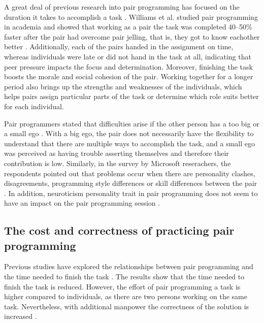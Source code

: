 \documentclass[conference]{IEEEtran}
\begin{document}
A great deal of previous research into pair programming has focused on the duration it takes to accomplish a task \cite{10.1145/2652524.2652529, Williams2000Strengthening, Hannay2009effectiveness}. Williams et al. studied pair programming in academia and showed that working as a pair the task was completed 40--50\% faster after the pair had overcome pair jelling, that is, they got to know eachother better \cite{Williams2000Strengthening}. Additionally, each of the pairs handed in the assignment on time, whereas individuals were late or did not hand in the task at all, indicating that peer pressure impacts the focus and determination. Moreover, finishing the task boosts the morale and social cohesion of the pair. Working together for a longer period also brings up the strengths and weaknesses of the individuals, which helps pairs assign particular parts of the task or determine which role suits better for each individual.

Pair programmers stated that difficulties arise if the other person has a too big or a small ego \cite{Williams2000Strengthening}. With a big ego, the pair does not necessarily have the flexibility to understand that there are multiple ways to accomplish the task, and a small ego was perceived as having trouble asserting themselves and therefore their contribution is low. Similarly, in the survey by Microsoft reserachers, the respondents pointed out that problems occur when there are personality clashes, disagreements, programming style differences or skill differences between the pair \cite{10.1145/1414004.1414026}. In addition, neuroticism personality trait in pair programming does not seem to have an impact on the pair programming session \cite{10.1145/1852786.1852816}. 



\subsection{The cost and correctness of practicing pair programming}

Previous studies have explored the relationships between pair programming and the time needed to finish the task \cite{10.1145/1414004.1414026, 10.5555/377517.377531, Arisholm2007Evaluating}. The results show that the time needed to finish the task is reduced. However, the effort of pair programming a task is higher compared to individuals, as there are two persons working on the same task. Nevertheless, with additional manpower the correctness of the solution is increased \cite{Arisholm2007Evaluating, Williams2000Strengthening, 10.1145/1159733.1159749}.
\end{document}
